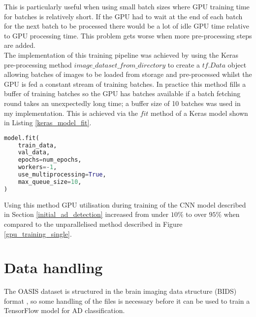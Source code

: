\documentclass[
    author={Kai Hulme},
    supervisor={Dr Jon Bird},
    degree={BSc},
    title={Generative Adversarial Networks as an Augmentation Technique},
    subtitle={for Alzheimer's Disease Detection in MRI Volumes},
    type={Research},
    year={2021} 
]{dissertation}
\begin{document}
This is particularly useful when using small batch sizes where GPU training time for batches is relatively short. If the GPU had to wait at the end of each batch for the next batch to be processed there would be a lot of idle GPU time relative to GPU processing time. This problem gets worse when more pre-processing steps are added. \\

The implementation of this training pipeline was achieved by using the Keras pre-processing method
$image\_dataset\_from\_directory$ to create a $tf.Data$ object allowing batches of images to be loaded from storage and pre-processed whilst the GPU is fed a constant stream of training batches. In practice this method fills a buffer of training batches so the GPU has batches available if a batch fetching round takes an unexpectedly long time; a buffer size of 10 batches was used in my implementation. This is achieved via the $fit$ method of a Keras model shown in Listing \ref{keras_model_fit}. \\

\begin{lstlisting}[float={t},language=Python, caption={Keras model fit function for parallelising batch fetching and training with a batch buffer. train\_data is a tf.Data object which fetches batches of images from a given directory. During training the maximum number of CPU threads available will work on fetching and pre-processing batches of images to fill a queue of 10 batches whilst the GPU trains on each batch in the queue. An epoch completes once training has been completed on all batches. At the end of an epoch the model is evaluated on the validation data.}, label={keras_model_fit}]
model.fit(
    train_data,
    val_data,
    epochs=num_epochs,
    workers=-1,
    use_multiprocessing=True,
    max_queue_size=10,
)
\end{lstlisting}

Using this method GPU utilisation during training of the CNN model described in Section \ref{initial_ad_detection} increased from under $10\%$ to over $95\%$ when compared to the unparallelised method described in Figure \ref{gpu_training_single}.


\section{Data handling}

The OASIS dataset is structured in the brain imaging data structure (BIDS) format \cite{marcus2007open}, so some handling of the files is necessary before it can be used to train a TensorFlow model for AD classification.
\end{document}
